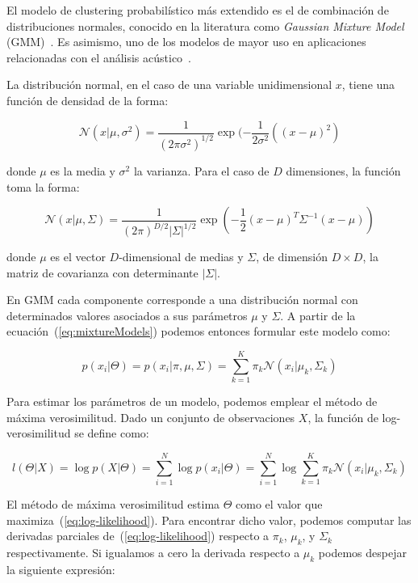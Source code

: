 El modelo de clustering probabilístico más extendido es el de combinación de distribuciones normales, conocido en la literatura como \textit{Gaussian Mixture Model} (GMM)~\cite{Murphy12}.
Es asimismo, uno de los modelos de mayor uso en aplicaciones relacionadas con el análisis acústico~\cite{Kakar13,Virtanen18,Somervuo06,Lee08,Kwan06}.

La distribución normal, en el caso de una variable unidimensional $x$, tiene una función de densidad de la forma:

\begin{equation}
    \label{eq:singleGaussian}
    \mathcal{N}(x|\mu,\sigma^2)=\frac{1}{(2\pi\sigma^2)^{1/2}}\exp{(-\frac{1}{2\sigma^2}((x-\mu)^2)}
\end{equation}

\noindent
donde $\mu$ es la media y $\sigma^2$ la varianza.
Para el caso de $D$ dimensiones, la función toma la forma:

\begin{equation}
    \label{eq:multidimGaussian}
    \mathcal{N}(x|\mu,\Sigma)=\frac{1}{(2\pi)^{D/2}|\Sigma|^{1/2}}\exp{(-\frac{1}{2}(x-\mu)^T \Sigma^{-1}(x-\mu))}
\end{equation}

\noindent
donde $\mu$ es el vector $D$-dimensional de medias y $\Sigma$, de dimensión $D\times D$, la matriz de covarianza con determinante $|\Sigma|$.

En GMM cada componente corresponde a una distribución normal con determinados valores asociados a sus parámetros $\mu$ y $\Sigma$.
A partir de la ecuación~(\ref{eq:mixtureModels}) podemos entonces formular este modelo como:

\begin{equation}
    \label{eq:GMM}
    p(x_i|\Theta) = p(x_i|\pi,\mu,\Sigma)= \sum_{k=1}^{K}{\pi_k \mathcal{N}(x_i|\mu_k,\Sigma_k)}
\end{equation}

Para estimar los parámetros de un modelo, podemos emplear el método de máxima verosimilitud.
Dado un conjunto de observaciones $X$, la función de log-verosimilitud se define como:

\begin{equation}
    \label{eq:log-likelihood}
    l(\Theta|X) = \log{p(X|\Theta)} = \sum_{i=1}^{N}{\log{p(x_i|\Theta)}} = \sum_{i=1}^{N}{\log{\sum_{k=1}^{K}{\pi_k \mathcal{N}(x_i|\mu_k,\Sigma_k)}}}
\end{equation}

El método de máxima verosimilitud estima $\Theta$ como el valor que maximiza~(\ref{eq:log-likelihood}).
Para encontrar dicho valor, podemos computar las derivadas parciales de~(\ref{eq:log-likelihood}) respecto a $\pi_k$, $\mu_k$, y $\Sigma_k$ respectivamente.
Si igualamos a cero la derivada respecto a $\mu_k$ podemos despejar la siguiente expresión:

